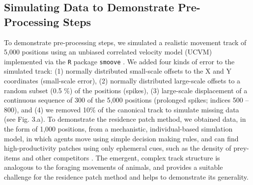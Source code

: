 \begin{refsection}


    \subsection*{Simulating Data to Demonstrate Pre-Processing Steps}

    To demonstrate pre-processing steps, we simulated a realistic movement track of 5,000 positions using an unbiased correlated velocity model (UCVM) implemented via the \texttt{R} package \texttt{smoove} \citep[][see Fig. 3.a]{gurarie2017}.
    We added four kinds of error to the simulated track: (1) normally distributed small-scale offsets to the X and Y coordinates (small-scale error), (2) normally distributed large-scale offsets to a random subset (0.5 \%) of the positions (spikes), (3) large-scale displacement of a continuous sequence of 300 of the 5,000 positions (prolonged spikes; indices 500 -- 800), and (4) we removed 10\% of the canonical track to simulate missing data (see Fig. 3.a).
    To demonstrate the residence patch method, we obtained data, in the form of 1,000 positions, from a mechanistic, individual-based simulation model, in which agents move using simple decision making rules, and can find high-productivity patches using only ephemeral cues, such as the density of prey-items and other competitors \citep{gupte2021a, netz2021}.
    The emergent, complex track structure is analogous to the foraging movements of animals, and provides a suitable challenge for the residence patch method and helps to demonstrate its generality.


\end{refsection}
